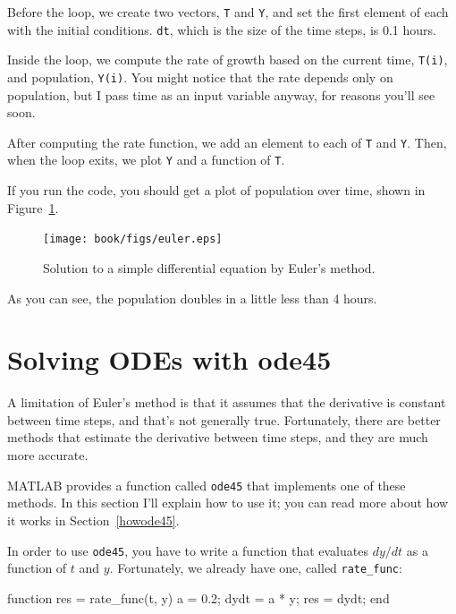 Before the loop, we create two vectors, {\tt T} and {\tt Y}, and set the first element of each with the initial conditions.  {\tt dt}, which is the size of the time steps, is 0.1 hours.

Inside the loop, we compute the rate of growth based on the current time, {\tt T(i)}, and population, {\tt Y(i)}.  You might notice that the rate depends only on population, but I pass time as an input variable anyway, for reasons you'll see soon.

After computing the rate function, we add an element to each of {\tt T} and {\tt Y}.  Then, when the loop exits, we plot {\tt Y} and a function of {\tt T}.

If you run the code, you should get a plot of population over time, shown in Figure~\ref{fig:euler}. 

\begin{figure}[ht]
\centerline{\texttt{[image: book/figs/euler.eps]}}
\caption{Solution to a simple differential equation by Euler's method.}
\label{fig:euler}
\end{figure}

As you can see, the population doubles in a little less than 4 hours.


\section{Solving ODEs with ode45}
\label{ode45}

A limitation of Euler's method is that it assumes that the derivative is constant between time steps, and that's not generally true.  Fortunately, there are better methods that estimate the derivative between time steps, and they are much more accurate.


MATLAB provides a function called {\tt ode45} that implements one of these methods.  In this section I'll explain how to use it; you can read more about how it works in Section~\ref{howode45}.


In order to use {\tt ode45}, you have to write a function that evaluates $dy/dt$ as a function of $t$ and $y$.  Fortunately, we already have one, called \verb"rate_func":

\begin{code}
function res = rate_func(t, y)
   a = 0.2;
   dydt = a * y;
   res = dydt;
end
\end{code}


